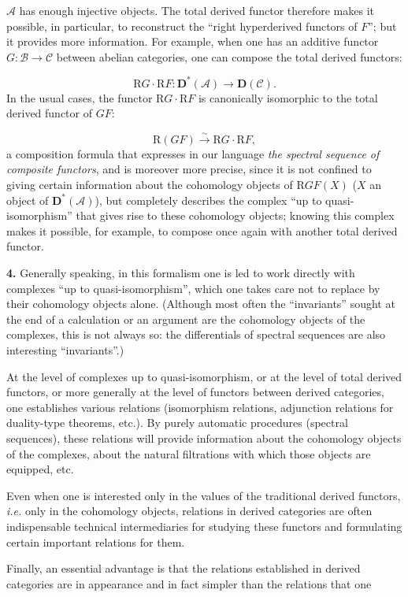 %
$\mathcal A$ has enough injective objects. The total derived functor therefore
makes it possible, in particular, to reconstruct the ``right hyperderived
functors of $F$''; but it provides more information. For example, when one has
an additive functor $G:\mathcal B\to\mathcal C$ between abelian categories,
one can compose the total derived functors:

\[
\mathrm R G\mathbin{\cdot}\mathrm R F:
\mathbf D^*(\mathcal A)\longrightarrow\mathbf D(\mathcal C).
\]
In the usual cases, the functor
$\mathrm R G\mathbin{\cdot}\mathrm R F$ is canonically isomorphic to the
total derived functor of $GF$:

\[
\mathrm R(GF)\xrightarrow{\sim}
\mathrm R G\mathbin{\cdot}\mathrm R F,
\]
a composition formula that expresses in our language
\emph{the spectral sequence of composite functors}, and is moreover more
precise, since it is not confined to giving certain information about the
cohomology objects of $\mathrm R GF(X)$
($X$ an object of $\mathbf D^*(\mathcal A)$), but completely describes the
complex ``up to quasi-isomorphism'' that gives rise to these cohomology
objects; knowing this complex makes it possible, for example, to compose once
again with another total derived functor.

\noindent\textbf{4.}\quad
Generally speaking, in this formalism one is led to work directly with
complexes ``up to quasi-isomorphism'', which one takes care not to replace by
their cohomology objects alone. (Although most often the ``invariants'' sought
at the end of a calculation or an argument are the cohomology objects of the
complexes, this is not always so: the differentials of spectral sequences are
also interesting ``invariants''.)

At the level of complexes up to quasi-isomorphism, or at the level of total
derived functors, or more generally at the level of functors between derived
categories, one establishes various relations (isomorphism relations,
adjunction relations for duality-type theorems, etc.). By purely automatic
procedures (spectral sequences), these relations will provide information
about the cohomology objects of the complexes, about the natural filtrations
with which those objects are equipped, etc.

Even when one is interested only in the values of the traditional derived
functors, \emph{i.e.} only in the cohomology objects, relations in derived
categories are often indispensable technical intermediaries for studying
these functors and formulating certain important relations for them.

Finally, an essential advantage is that the relations established in derived
categories are in appearance and in fact simpler than the relations that one
